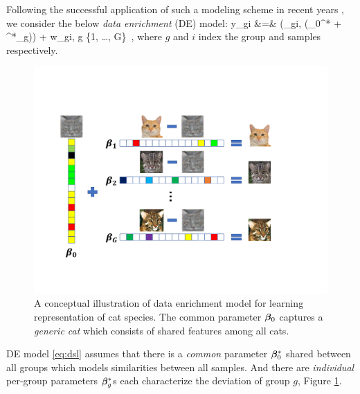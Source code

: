 Following the successful application of such a modeling scheme in recent years \cite{domu16, grti16,  olvi14, olvi15}, we consider the below \emph{data enrichment} (DE) model: 
\be
\label{eq:dsl}
y_{gi} &=& \phi(\x_{gi}, (\bbeta_0^* + \bbeta^*_g)) + w_{gi}, \quad g \in \{1, \dots, G\}~,
\ee
where $g$ and $i$ index the group and samples respectively. 
\begin{figure}%
	\centering
	\includegraphics[scale=.45]{./img/concept.pdf}
	\caption{A conceptual illustration of data enrichment model for learning representation of  cat species. The common parameter $\boldsymbol{\beta}_0$ captures a \emph{generic cat} which consists of shared features among all cats.}
	\label{fig:cat}		
\end{figure}
DE model \eqref{eq:dsl} assumes that there is a \emph{common} parameter $\boldsymbol{\beta}^*_0$ shared between all groups which models similarities between all samples. And there are \emph{individual} per-group parameters $\boldsymbol{\beta}_g^*$s each characterize the deviation of group $g$, Figure \ref{fig:cat}.%

